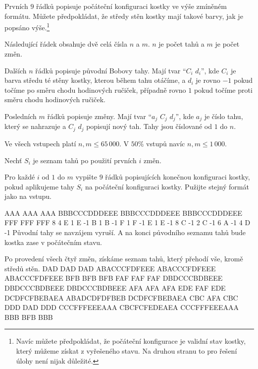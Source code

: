 
Prvních $9$ řádků popisuje počáteční konfiguraci kostky
ve výše zmíněném formátu. Můžete předpokládat, že středy
stěn kostky mají takové barvy, jak je popsáno
výše.\footnote{Navíc můžete předpokládat, že počáteční konfigurace
je validní stav kostky, který můžeme získat z vyřešeného stavu.
Na druhou stranu to pro řešení úlohy není nijak důležité.}

Následující řádek obsahuje dvě celá čísla $n$ a $m$.
$n$ je počet tahů a $m$ je počet změn.

Dalších $n$ řádků popisuje původní Bobovy tahy.
Mají tvar ``$C_i$ $d_i$'',
kde $C_i$ je barva středu té stěny kostky,
kterou během tahu otáčíme, a $d_i$ je rovno $-1$
pokud točíme po směru chodu hodinových ručiček, případně
rovno $1$ pokud točíme proti směru chodu hodinových ručiček.

Posledních $m$ řádků popisuje změny.
Mají tvar ``$a_j$ $C_j$ $d_j$'',
kde $a_j$ je číslo tahu, který se nahrazuje
a $C_j$ $d_j$ popisují nový tah.
Tahy jsou číslované od $1$ do $n$.


Ve všech vstupech platí $n, m \leq 65\,000$.
V $50\%$ vstupů navíc $n, m \leq 1\,000$.

\pagebreak


Nechť $S_i$ je seznam tahů po použití prvních $i$ změn.

Pro každé $i$ od $1$ do $m$ vypište $9$ řádků popisujících konečnou konfiguraci kostky, pokud aplikujeme tahy $S_i$ na počáteční konfiguraci kostky. Pužijte stejný formát jako na vstupu.


\sampleIN
AAA
AAA
AAA
BBBCCCDDDEEE
BBBCCCDDDEEE
BBBCCCDDDEEE
FFF
FFF
FFF
8 4
E 1
E -1
B 1
B -1
F 1
F -1
E 1
E -1
8 C -1
2 C -1
6 A -1
4 D -1
\sampleCOMMENT
Původní tahy se navzájem vyruší. A na konci původního seznamu tahů
bude kostka zase v počátečním stavu.

Po provedení všech čtyř změn, získáme seznam tahů, který
přehodí vše, kromě středů stěn.
\sampleOUT
DAD
DAD
DAD
ABACCCFDFEEE
ABACCCFDFEEE
ABACCCFDFEEE
BFB
BFB
BFB
FAF
FAF
FAF
DBDCCCBDBEEE
DBDCCCBDBEEE
DBDCCCBDBEEE
AFA
AFA
AFA
EDE
FAF
EDE
DCDFCFBEBAEA
ABADCDFDFBEB
DCDFCFBEBAEA
CBC
AFA
CBC
DDD
DAD
DDD
CCCFFFEEEAAA
CBCFCFEDEAEA
CCCFFFEEEAAA
BBB
BFB
BBB
\sampleEND



